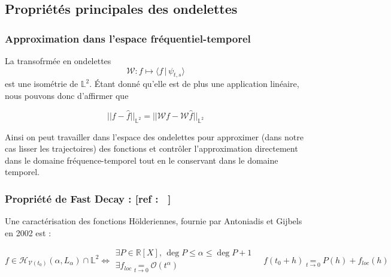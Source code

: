 
\subsection{Propriétés principales des ondelettes}

\smallskip


\subsubsection{Approximation dans l'espace fréquentiel-temporel}

La transofrmée en ondelettes
\begin{equation*}
	\mathcal W : f \mapsto \langle f \, | \, \psi_{t,s} \rangle
\end{equation*}
est une isométrie de $\mathds L^2$. Étant donné qu'elle est de plus une application linéaire, nous pouvons donc d'affirmer que

\begin{equation*}
	\boxed{|| f - \hat f ||_{\mathds L^2} = || \mathcal W f - \mathcal W \hat f ||_{\mathds L^2}}
\end{equation*}

Ainsi on peut travailler dans l'espace des ondelettes pour approximer (dans notre cas lisser les trajectoires) des fonctions et contrôler l'approximation directement dans le domaine fréquence-temporel tout en le conservant dans le domaine temporel.

\subsubsection{Propriété de Fast Decay : [ref : ~\cite{mallat-wavelet-course-ens-wavelet-zoom}]}

Une caractérisation des fonctions Hölderiennes, fournie par Antoniadis et Gijbels en 2002 est :

\begin{equation*}
	f \in \mathcal H_{\mathcal V(t_0)}(\alpha, L_\alpha) \cap \mathds L^2 \iff
	\begin{array}{l}
		\exists P \in \mathds R[X], \, \deg P \leq \alpha \leq \deg P + 1
		\\
		\exists f_{loc} \underset{t \rightarrow 0}{=} \mathcal O(t^\alpha)
	\end{array}
	\quad f(t_0 + h) \underset{t \rightarrow 0}{=} P(h) + f_{loc}(h)
\end{equation*}

